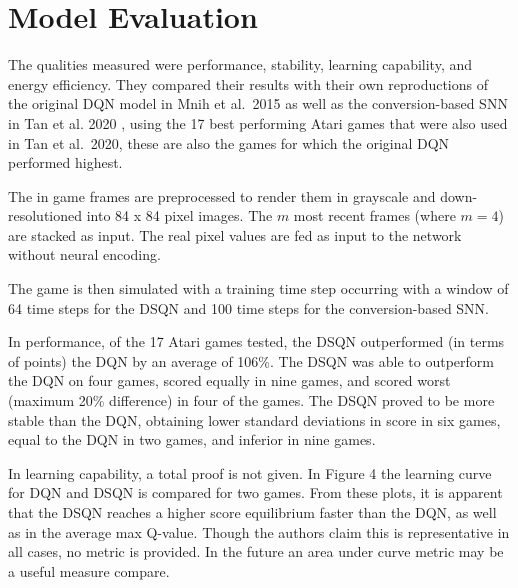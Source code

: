 \documentclass[journal,onecolumn]{IEEEtran}
\begin{document}


\section{Model Evaluation}\label{model-evaluation}

The qualities measured were performance, stability, learning
capability, and energy efficiency. They compared their results with
their own reproductions of the original DQN model in Mnih et al.~2015 as
well as the conversion-based SNN in Tan et al. 2020 \autocite{tanStrategyBenchmarkConverting2020}, using the 17 best
performing Atari games that were also used in Tan et al.~2020, these
are also the games for which the original DQN performed highest.

The in game frames are preprocessed to render them in grayscale and
down-resolutioned into 84 x 84 pixel images. The \(m\) most recent
frames (where \(m=4\)) are stacked as input. The real pixel values are
fed as input to the network without neural encoding.

The game is then simulated with a training time step occurring with a
window of 64 time steps for the DSQN and 100 time steps for the
conversion-based SNN.

In performance, of the 17 Atari games tested, the DSQN outperformed (in
terms of points) the DQN by an average of 106\%. The DSQN was able to
outperform the DQN on four games, scored equally in nine games, and
scored worst (maximum 20\% difference) in four of the games. The DSQN
proved to be more stable than the DQN, obtaining lower standard deviations in score in six games, equal to the DQN in two games, and inferior in nine games.

In learning capability, a total proof is not given. In Figure 4 the
learning curve for DQN and DSQN is compared for two games. From
these plots, it is apparent that the DSQN reaches a higher score
equilibrium faster than the DQN, as well as in the average max Q-value.
Though the authors claim this is representative in all cases, no metric
is provided. In the future an area under curve metric may be a useful
measure compare.
\end{document}
